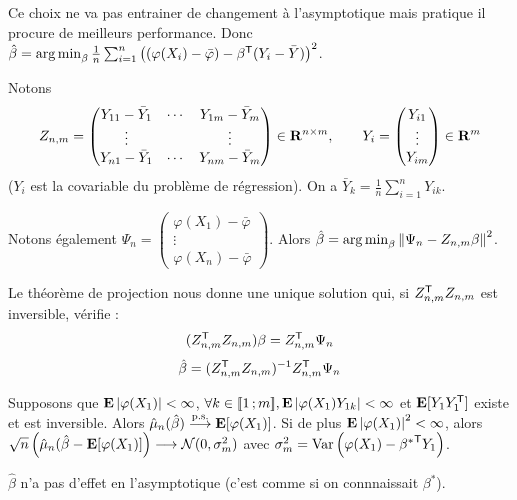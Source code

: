 	Ce choix ne va pas entrainer de changement à l'asymptotique mais pratique il procure de meilleurs performance.
	Donc $\hat{\beta} = \operatorname{arg\, min}_\beta \frac{1}{n} \sum_{i = 1}^n \left( (\varphi(X_i) - \bar{\varphi}) - \beta^\mathsf{T} (Y_i - \bar{Y}) \right)^2$.
	
	Notons
	$$Z_{n,m} = \begin{pmatrix}
		Y_{11} - \bar{Y}_1 & \cdots & Y_{1m} - \bar{Y}_m \\
		\vdots             &        & \vdots \\
		Y_{n1} - \bar{Y}_1 & \cdots & Y_{nm} - \bar{Y}_m
		\end{pmatrix} \in \mathbf{R}^{n \times m}, \qquad
		Y_i = \begin{pmatrix} Y_{i1} \\ \vdots \\ Y_{im} \end{pmatrix} \in \mathbf{R}^m$$
	($Y_i$ est la covariable du problème de régression).
	On a $\bar{Y}_k = \frac{1}{n} \sum_{i = 1}^n Y_{ik}$.
	
	Notons également $\Psi_n = \begin{pmatrix} \varphi(X_1) - \bar{\varphi} \\ \vdots \\ \varphi(X_n) - \bar{\varphi} \end{pmatrix}$.
	Alors $\hat{\beta} = \operatorname{arg\, min}_{\beta} \left\lVert\Psi_n - Z_{n,m}\beta\right\rVert^2$.
	
	Le théorème de projection nous donne une unique solution qui, si $Z_{n,m}^\mathsf{T} Z_{n,m}$ est inversible, vérifie :
	$$(Z_{n,m}^\mathsf{T} Z_{n,m}) \beta = Z_{n,m}^\mathsf{T} \Psi_n$$
	$$\hat{\beta} = (Z_{n,m}^\mathsf{T} Z_{n,m})^{-1} Z_{n,m}^\mathsf{T} \Psi_n$$
	
	\begin{pop}
		Supposons que $\mathbf{E} \left\lvert\varphi(X_1)\right\rvert < \infty$, $\forall k \in \mathopen{[\![}1\mathclose{}\mathpunct{};m\mathclose{]\!]}, \mathbf{E} \left\lvert\varphi(X_1) Y_{1k}\right\rvert < \infty$ et $\mathbf{E}[Y_1 Y_1^\mathsf{T}]$ existe et est inversible.
		Alors $\hat{\mu}_n(\hat{\beta}) \overset{\text{p.s.}}{\longrightarrow} \mathbf{E}[\varphi(X_1)]$.
		Si de plus $\mathbf{E} \left\lvert\varphi(X_1)\right\rvert^2 < \infty$, alors $\sqrt{n} \left( \hat{\mu}_n(\hat{\beta} - \mathbf{E}[\varphi(X_1)] \right) \longrightarrow \mathcal{N}(0,\sigma_m^2)$ avec $\sigma_m^2 = \operatorname{Var} \left( \varphi(X_1) - {\beta^*}^\mathsf{T} Y_1 \right)$.
	\end{pop}
	
	\begin{rem}
		$\hat{\beta}$ n'a pas d'effet en l'asymptotique (c'est comme si on connnaissait $\beta^*$).
	\end{rem}
	
